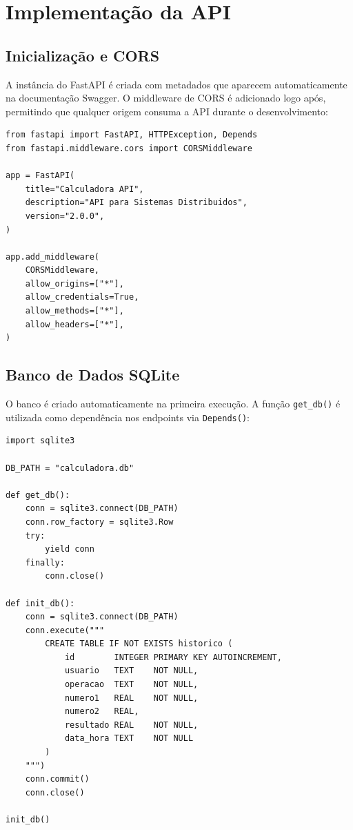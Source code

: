 \documentclass[12pt, a4paper]{article}
\begin{document}
\section{Implementação da API}

\subsection{Inicialização e CORS}

A instância do FastAPI é criada com metadados que aparecem automaticamente na documentação Swagger. O middleware de CORS é adicionado logo após, permitindo que qualquer origem consuma a API durante o desenvolvimento:

\begin{lstlisting}[caption={Criação do app e configuração do CORS}]
from fastapi import FastAPI, HTTPException, Depends
from fastapi.middleware.cors import CORSMiddleware

app = FastAPI(
    title="Calculadora API",
    description="API para Sistemas Distribuidos",
    version="2.0.0",
)

app.add_middleware(
    CORSMiddleware,
    allow_origins=["*"],
    allow_credentials=True,
    allow_methods=["*"],
    allow_headers=["*"],
)
\end{lstlisting}

\subsection{Banco de Dados SQLite}

O banco é criado automaticamente na primeira execução. A função \texttt{get\_db()} é utilizada como dependência nos endpoints via \texttt{Depends()}:

\begin{lstlisting}[caption={Inicialização do SQLite e injeção de dependência}]
import sqlite3

DB_PATH = "calculadora.db"

def get_db():
    conn = sqlite3.connect(DB_PATH)
    conn.row_factory = sqlite3.Row
    try:
        yield conn
    finally:
        conn.close()

def init_db():
    conn = sqlite3.connect(DB_PATH)
    conn.execute("""
        CREATE TABLE IF NOT EXISTS historico (
            id        INTEGER PRIMARY KEY AUTOINCREMENT,
            usuario   TEXT    NOT NULL,
            operacao  TEXT    NOT NULL,
            numero1   REAL    NOT NULL,
            numero2   REAL,
            resultado REAL    NOT NULL,
            data_hora TEXT    NOT NULL
        )
    """)
    conn.commit()
    conn.close()

init_db()
\end{lstlisting}
\end{document}
